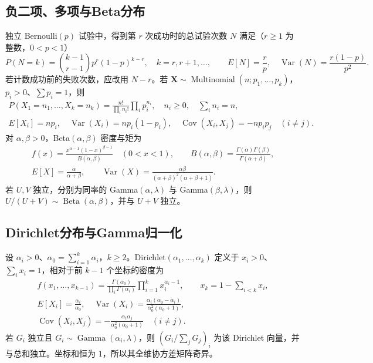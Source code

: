 \documentclass[../main.tex]{subfiles}
\begin{document}
\subsection{负二项、多项与Beta分布}
独立 Bernoulli$(p)$ 试验中，得到第 $r$ 次成功时的总试验次数 $N$ 满足（$r\ge1$ 为整数，$0<p<1$）
\[
P(N=k)=\binom{k-1}{r-1}p^r(1-p)^{k-r},\quad k=r,r+1,\ldots,
\qquad E[N]=\frac rp,\quad\operatorname{Var}(N)=\frac{r(1-p)}{p^2}.
\]
若计数成功前的失败次数，应改用 $N-r$。若 $\bm X\sim\operatorname{Multinomial}(n;p_1,\ldots,p_k)$，$p_i>0$、$\sum p_i=1$，则
\begin{gather*}
P(X_1=n_1,\ldots,X_k=n_k)=\frac{n!}{\prod_i n_i!}\prod_i p_i^{n_i},\quad
n_i\ge0,\quad\sum_i n_i=n,\\
E[X_i]=np_i,\quad\operatorname{Var}(X_i)=np_i(1-p_i),\quad
\operatorname{Cov}(X_i,X_j)=-np_ip_j\quad(i\ne j).
\end{gather*}
对 $\alpha,\beta>0$，Beta$(\alpha,\beta)$ 密度与矩为
\begin{gather*}
f(x)=\frac{x^{\alpha-1}(1-x)^{\beta-1}}{B(\alpha,\beta)}\quad(0<x<1),\qquad
B(\alpha,\beta)=\frac{\Gamma(\alpha)\Gamma(\beta)}{\Gamma(\alpha+\beta)},\\
E[X]=\frac\alpha{\alpha+\beta},\qquad
\operatorname{Var}(X)=\frac{\alpha\beta}{(\alpha+\beta)^2(\alpha+\beta+1)}.
\end{gather*}
若 $U,V$ 独立，分别为同率的 Gamma$(\alpha,\lambda)$ 与 Gamma$(\beta,\lambda)$，则 $U/(U+V)\sim\operatorname{Beta}(\alpha,\beta)$，并与 $U+V$ 独立。

\subsection{Dirichlet分布与Gamma归一化}
设 $\alpha_i>0$、$\alpha_0=\sum_{i=1}^k\alpha_i$，$k\ge2$。Dirichlet$(\alpha_1,\ldots,\alpha_k)$ 定义于 $x_i>0$、$\sum_i x_i=1$，相对于前 $k-1$ 个坐标的密度为
\begin{gather*}
f(x_1,\ldots,x_{k-1})=\frac{\Gamma(\alpha_0)}{\prod_i\Gamma(\alpha_i)}\prod_{i=1}^k x_i^{\alpha_i-1},
\qquad x_k=1-\sum_{i<k}x_i,\\
E[X_i]=\frac{\alpha_i}{\alpha_0},\quad
\operatorname{Var}(X_i)=\frac{\alpha_i(\alpha_0-\alpha_i)}{\alpha_0^2(\alpha_0+1)},\\
\operatorname{Cov}(X_i,X_j)=-\frac{\alpha_i\alpha_j}{\alpha_0^2(\alpha_0+1)}\quad(i\ne j).
\end{gather*}
若 $G_i$ 独立且 $G_i\sim\operatorname{Gamma}(\alpha_i,\lambda)$，则 $(G_i/\sum_jG_j)_i$ 为该 Dirichlet 向量，并与总和独立。坐标和恒为 $1$，所以其全维协方差矩阵奇异。
\end{document}
